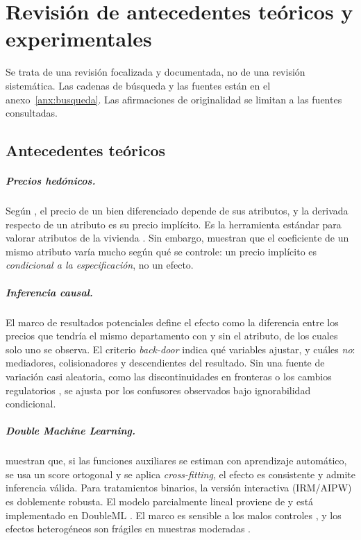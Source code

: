 \chapter{Revisión de antecedentes teóricos y experimentales}\label{cap:estado}

Se trata de una revisión focalizada y documentada, no de una revisión sistemática. Las cadenas de búsqueda y las fuentes están en el anexo~\ref{anx:busqueda}. Las afirmaciones de originalidad se limitan a las fuentes consultadas.

\section{Antecedentes teóricos}\label{sec:ant_teo}

\paragraph{Precios hedónicos.} Según \citet{rosen1974}, el precio de un bien diferenciado depende de sus atributos, y la derivada respecto de un atributo es su precio implícito. Es la herramienta estándar para valorar atributos de la vivienda \citep{malpezzi2003}. Sin embargo, \citet{sirmans2005} muestran que el coeficiente de un mismo atributo varía mucho según qué se controle: un precio implícito es \emph{condicional a la especificación}, no un efecto.

\paragraph{Inferencia causal.} El marco de resultados potenciales \citep{imbens2015,hernan2020} define el efecto como la diferencia entre los precios que tendría el mismo departamento con y sin el atributo, de los cuales solo uno se observa. El criterio \textit{back-door} \citep{pearl2009} indica qué variables ajustar, y \citet{cinelli2024} cuáles \emph{no}: mediadores, colisionadores y descendientes del resultado. Sin una fuente de variación casi aleatoria, como las discontinuidades en fronteras \citep{black1999,keele2015} o los cambios regulatorios \citep{chay2005}, se ajusta por los confusores observados bajo ignorabilidad condicional.

\paragraph{Double Machine Learning.} \citet{chernozhukov2018} muestran que, si las funciones auxiliares se estiman con aprendizaje automático, se usa un score ortogonal y se aplica \textit{cross-fitting}, el efecto es consistente y admite inferencia válida. Para tratamientos binarios, la versión interactiva (IRM/AIPW) es doblemente robusta. El modelo parcialmente lineal proviene de \citet{robinson1988} y está implementado en DoubleML \citep{bach2022}. El marco es sensible a los malos controles \citep{hunermund2023}, y los efectos heterogéneos \citep{wager2018,athey2019} son frágiles en muestras moderadas \citep{knaus2021}.

